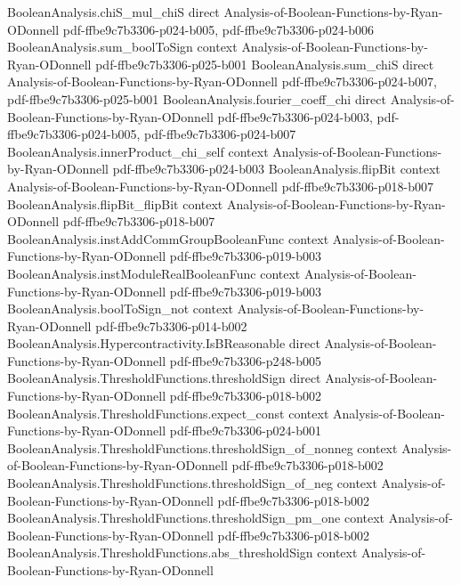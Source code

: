 \begin{lemma}
\proofstep
  {BooleanAnalysis.chiS_mul_chiS}
  {direct}
  {Analysis-of-Boolean-Functions-by-Ryan-ODonnell}
  {pdf-ffbe9c7b3306-p024-b005,
    pdf-ffbe9c7b3306-p024-b006}
\proofstep
  {BooleanAnalysis.sum_boolToSign}
  {context}
  {Analysis-of-Boolean-Functions-by-Ryan-ODonnell}
  {pdf-ffbe9c7b3306-p025-b001}
\proofstep
  {BooleanAnalysis.sum_chiS}
  {direct}
  {Analysis-of-Boolean-Functions-by-Ryan-ODonnell}
  {pdf-ffbe9c7b3306-p024-b007,
    pdf-ffbe9c7b3306-p025-b001}
\proofstep
  {BooleanAnalysis.fourier_coeff_chi}
  {direct}
  {Analysis-of-Boolean-Functions-by-Ryan-ODonnell}
  {pdf-ffbe9c7b3306-p024-b003,
    pdf-ffbe9c7b3306-p024-b005,
    pdf-ffbe9c7b3306-p024-b007}
\proofstep
  {BooleanAnalysis.innerProduct_chi_self}
  {context}
  {Analysis-of-Boolean-Functions-by-Ryan-ODonnell}
  {pdf-ffbe9c7b3306-p024-b003}
\proofstep
  {BooleanAnalysis.flipBit}
  {context}
  {Analysis-of-Boolean-Functions-by-Ryan-ODonnell}
  {pdf-ffbe9c7b3306-p018-b007}
\proofstep
  {BooleanAnalysis.flipBit_flipBit}
  {context}
  {Analysis-of-Boolean-Functions-by-Ryan-ODonnell}
  {pdf-ffbe9c7b3306-p018-b007}
\proofstep
  {BooleanAnalysis.instAddCommGroupBooleanFunc}
  {context}
  {Analysis-of-Boolean-Functions-by-Ryan-ODonnell}
  {pdf-ffbe9c7b3306-p019-b003}
\proofstep
  {BooleanAnalysis.instModuleRealBooleanFunc}
  {context}
  {Analysis-of-Boolean-Functions-by-Ryan-ODonnell}
  {pdf-ffbe9c7b3306-p019-b003}
\proofstep
  {BooleanAnalysis.boolToSign_not}
  {context}
  {Analysis-of-Boolean-Functions-by-Ryan-ODonnell}
  {pdf-ffbe9c7b3306-p014-b002}
\proofstep
  {BooleanAnalysis.Hypercontractivity.IsBReasonable}
  {direct}
  {Analysis-of-Boolean-Functions-by-Ryan-ODonnell}
  {pdf-ffbe9c7b3306-p248-b005}
\proofstep
  {BooleanAnalysis.ThresholdFunctions.thresholdSign}
  {direct}
  {Analysis-of-Boolean-Functions-by-Ryan-ODonnell}
  {pdf-ffbe9c7b3306-p018-b002}
\proofstep
  {BooleanAnalysis.ThresholdFunctions.expect_const}
  {context}
  {Analysis-of-Boolean-Functions-by-Ryan-ODonnell}
  {pdf-ffbe9c7b3306-p024-b001}
\proofstep
  {BooleanAnalysis.ThresholdFunctions.thresholdSign_of_nonneg}
  {context}
  {Analysis-of-Boolean-Functions-by-Ryan-ODonnell}
  {pdf-ffbe9c7b3306-p018-b002}
\proofstep
  {BooleanAnalysis.ThresholdFunctions.thresholdSign_of_neg}
  {context}
  {Analysis-of-Boolean-Functions-by-Ryan-ODonnell}
  {pdf-ffbe9c7b3306-p018-b002}
\proofstep
  {BooleanAnalysis.ThresholdFunctions.thresholdSign_pm_one}
  {context}
  {Analysis-of-Boolean-Functions-by-Ryan-ODonnell}
  {pdf-ffbe9c7b3306-p018-b002}
\proofstep
  {BooleanAnalysis.ThresholdFunctions.abs_thresholdSign}
  {context}
  {Analysis-of-Boolean-Functions-by-Ryan-ODonnell}

\end{lemma}
